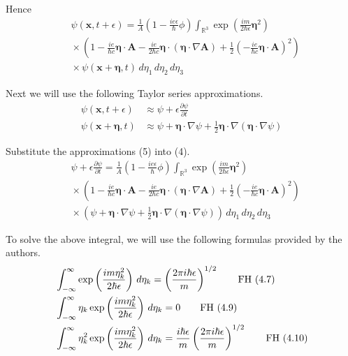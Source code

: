 \documentclass[12pt]{article}
\newcommand\INT{\int_{\mathbb R^3}}
\begin{document}
Hence
\begin{align*}
&\psi(\mathbf x,t+\epsilon)=
\frac{1}{A}
\left(1-\frac{ie\epsilon}{\hbar}\phi\right)
\INT\exp\left(\frac{im}{2\hbar\epsilon}\boldsymbol\eta^2\right)
\\
&{}\times\left(
1
-\frac{ie}{\hbar c}\boldsymbol\eta\cdot\mathbf A
-\frac{ie}{2\hbar c}\boldsymbol\eta\cdot(\boldsymbol\eta\cdot\nabla\mathbf A)
+\frac{1}{2}\left(-\frac{ie}{\hbar c}\boldsymbol\eta\cdot\mathbf A\right)^2
\right)
\\
&{}\times\psi(\mathbf x+\boldsymbol\eta,t)
\,d\eta_1\,d\eta_2\,d\eta_3
\tag{4}
\end{align*}

Next we will use the following Taylor series approximations.
\begin{equation*}
\begin{aligned}
\psi(\mathbf x,t+\epsilon)&\approx\psi+\epsilon\frac{\partial\psi}{\partial t}
\\
\psi(\mathbf x+\boldsymbol\eta,t)&\approx\psi+\boldsymbol\eta\cdot\nabla\psi
+\tfrac{1}{2}\boldsymbol\eta\cdot\nabla(\boldsymbol\eta\cdot\nabla\psi)
\end{aligned}
\tag{5}
\end{equation*}

Substitute the approximations (5) into (4).
\begin{align*}
&\psi+\epsilon\frac{\partial\psi}{\partial t}=
\frac{1}{A}
\left(1-\frac{ie\epsilon}{\hbar}\phi\right)
\INT\exp\left(\frac{im}{2\hbar\epsilon}\boldsymbol\eta^2\right)
\\
&{}\times\left(
1
-\frac{ie}{\hbar c}\boldsymbol\eta\cdot\mathbf A
-\frac{ie}{2\hbar c}\boldsymbol\eta\cdot(\boldsymbol\eta\cdot\nabla\mathbf A)
+\frac{1}{2}\left(-\frac{ie}{\hbar c}\boldsymbol\eta\cdot\mathbf A\right)^2
\right)
\\
&{}\times\left(
\psi+\boldsymbol\eta\cdot\nabla\psi
+\tfrac{1}{2}\boldsymbol\eta\cdot\nabla(\boldsymbol\eta\cdot\nabla\psi)
\right)
\,d\eta_1\,d\eta_2\,d\eta_3
\tag{6}
\end{align*}

To solve the above integral, we will use the following formulas provided by the authors.
\begin{align*}
&\int_{-\infty}^\infty\exp\left(\frac{im\eta_k^2}{2\hbar\epsilon}\right)\,d\eta_k
=\left(\frac{2\pi i\hbar\epsilon}{m}\right)^{1/2}
\tag*{\text{FH (4.7)}}
\\
&\int_{-\infty}^\infty\eta_k\exp\left(\frac{im\eta_k^2}{2\hbar\epsilon}\right)\,d\eta_k
=0
\tag*{\text{FH (4.9)}}
\\
&\int_{-\infty}^\infty\eta_k^2\exp\left(\frac{im\eta_k^2}{2\hbar\epsilon}\right)\,d\eta_k
=\frac{i\hbar\epsilon}{m}\left(\frac{2\pi i\hbar\epsilon}{m}\right)^{1/2}
\tag*{\text{FH (4.10)}}
\end{align*}
\end{document}
